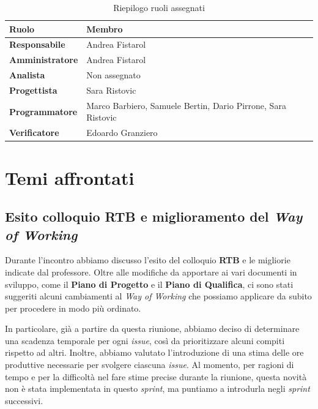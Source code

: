 \documentclass[12pt, a4paper]{article}
\begin{document}
\begin{table}[htbp]
    \centering
    \renewcommand{\arraystretch}{1.3}
    \begin{tabularx}{\textwidth}{|l|X|}
        \hline
        \textbf{Ruolo} & \textbf{Membro} \\ \hline
        \textbf{Responsabile} & Andrea Fistarol \\ \hline
        \textbf{Amministratore} & Andrea Fistarol  \\ \hline
        \textbf{Analista} & Non assegnato\\ \hline
        \textbf{Progettista} & Sara Ristovic \\ \hline
        \textbf{Programmatore} & Marco Barbiero, Samuele Bertin, Dario Pirrone, Sara Ristovic \\ \hline
        \textbf{Verificatore} & Edoardo Granziero \\ \hline
    \end{tabularx}
    \caption{Riepilogo ruoli assegnati}
\end{table}

\section{Temi affrontati}

\subsection{Esito colloquio \textbf{RTB} e miglioramento del \textit{Way of Working}}
Durante l'incontro abbiamo discusso l'esito del colloquio \textbf{RTB} e le migliorie indicate dal professore. Oltre alle modifiche da apportare ai vari documenti in sviluppo, come il \textbf{Piano di Progetto} e il \textbf{Piano di Qualifica}, ci sono stati suggeriti alcuni cambiamenti al \textit{Way of Working} che possiamo applicare da subito per procedere in modo più ordinato. 

In particolare, già a partire da questa riunione, abbiamo deciso di determinare una scadenza temporale per ogni \textit{issue}, così da prioritizzare alcuni compiti rispetto ad altri. Inoltre, abbiamo valutato l'introduzione di una stima delle ore produttive necessarie per svolgere ciascuna \textit{issue}. Al momento, per ragioni di tempo e per la difficoltà nel fare stime precise durante la riunione, questa novità non è stata implementata in questo \textit{sprint}, ma puntiamo a introdurla negli \textit{sprint} successivi.
\end{document}
